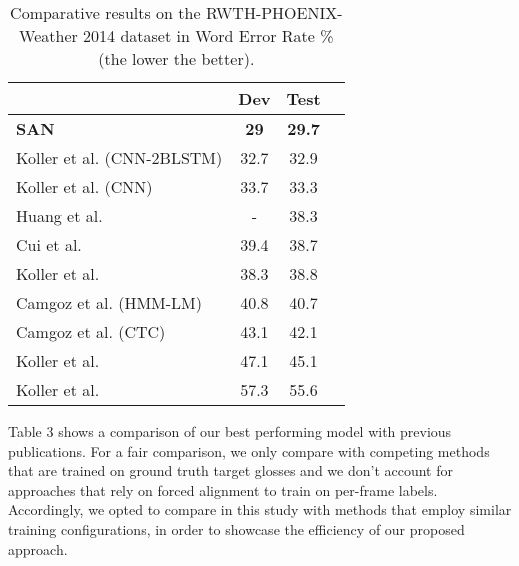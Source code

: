 \documentclass[a4paper,conference]{IEEEtran}
\begin{document}
\begin{table}[t]
\begin{center}

\setlength{\tabcolsep}{9pt}

\caption{Comparative results on the RWTH-PHOENIX-Weather 2014 dataset in Word Error Rate \% (the lower the better). }
\label{table:t3}
\begin{tabular}{l | c | c c}

& Dev & Test
\\



\hline

\textbf{SAN} & \textbf{29} & \textbf{29.7}  \\

Koller et al. (CNN-2BLSTM) \cite{koller2017re} & 32.7 & 32.9  \\

Koller et al. (CNN) \cite{koller2017re} & 33.7 & 33.3  \\

Huang et al. \cite{huang2018video} & 
- & 38.3 \\

Cui et al. \cite{Cui_2017_CVPR} & 39.4 & 38.7 \\

Koller et al. \cite{koller2016deep}  & 	38.3 & 38.8 \\

Camgoz et al. (HMM-LM) \cite{camgoz2017subunets} & 40.8 & 40.7 \\

Camgoz et al. (CTC) \cite{camgoz2017subunets} & 43.1 & 42.1 \\

Koller et al. \cite{koller2016deephand} & 47.1 & 45.1 \\

Koller et al. \cite{koller2015continuous} & 57.3 & 55.6 \\

\hline
\end{tabular}
\end{center}
\end{table}



Table 3 shows a comparison of our best performing model with previous publications. For a fair comparison,  we only compare with competing methods that are trained on ground truth target glosses and we don’t account for approaches that rely on forced alignment to train on per-frame labels. Accordingly, we opted to compare in this study with methods that employ similar training configurations, in order to showcase the efficiency of our proposed approach.
\end{document}
